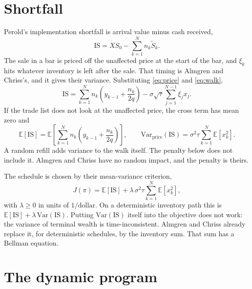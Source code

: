 \documentclass[11pt]{article}
\begin{document}
\section{Shortfall}
\label{sec:criterion}

Perold's implementation shortfall is arrival value minus cash received,
\begin{equation}
\label{eq:is}
\mathrm{IS} = XS_0 - \sum_{k=1}^{N} n_k \tilde S_k.
\end{equation}
The sale in a bar is priced off the unaffected price at the start of the bar, and \(\xi_k\) hits whatever inventory is left after the sale. That timing is Almgren and Chriss's, and it gives their variance. Substituting \eqref{eq:price} and \eqref{eq:walk},
\begin{equation}
\label{eq:split}
\mathrm{IS}
  = \sum_{k=1}^{N} n_k\left(y_{k-1} + \frac{n_k}{2q}\right)
  - \sigma\sqrt{\tau}\sum_{j=1}^{N-1}\xi_j x_j.
\end{equation}
If the trade list does not look at the unaffected price, the cross term has mean zero and
\begin{equation}
\label{eq:moments}
\mathbb{E}[\mathrm{IS}] = \mathbb{E}\!\left[\sum_{k=1}^{N} n_k\left(y_{k-1}+\frac{n_k}{2q}\right)\right],
\qquad
\mathrm{Var}_{\mathrm{price}}(\mathrm{IS}) = \sigma^{2}\tau\sum_{k=1}^{N}\mathbb{E}[x_k^{2}].
\end{equation}
A random refill adds variance to the walk itself. The penalty below does not include it. Almgren and Chriss have no random impact, and the penalty is theirs.

The schedule is chosen by their mean-variance criterion,
\begin{equation}
\label{eq:J}
J(\pi)
  = \mathbb{E}[\mathrm{IS}]
  + \lambda\,\sigma^{2}\tau\sum_{k=1}^{N}\mathbb{E}[x_k^{2}],
\end{equation}
with \(\lambda \geq 0\) in units of \(1/\mathrm{dollar}\). On a deterministic inventory path this is \(\mathbb{E}[\mathrm{IS}] + \lambda\,\mathrm{Var}(\mathrm{IS})\). Putting \(\mathrm{Var}(\mathrm{IS})\) itself into the objective does not work: the variance of terminal wealth is time-inconsistent. Almgren and Chriss already replace it, for deterministic schedules, by the inventory sum. That sum has a Bellman equation.

\section{The dynamic program}
\end{document}
